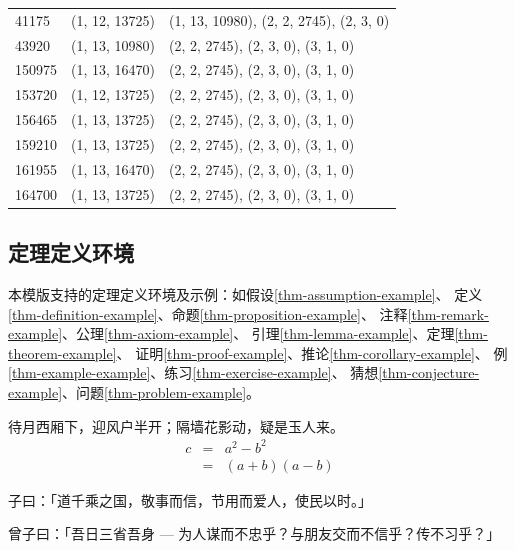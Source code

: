 \begin{longtable}{|l|l|l|}
    41175  & (1, 12, 13725) & (1, 13, 10980), (2,  2, 2745), (2, 3, 0) \\
    43920  & (1, 13, 10980) & (2,  2,  2745), (2,  3,    0), (3, 1, 0) \\
    150975 & (1, 13, 16470) & (2,  2,  2745), (2,  3,    0), (3, 1, 0) \\
    153720 & (1, 12, 13725) & (2,  2,  2745), (2,  3,    0), (3, 1, 0) \\
    156465 & (1, 13, 13725) & (2,  2,  2745), (2,  3,    0), (3, 1, 0) \\
    159210 & (1, 13, 13725) & (2,  2,  2745), (2,  3,    0), (3, 1, 0) \\
    161955 & (1, 13, 16470) & (2,  2,  2745), (2,  3,    0), (3, 1, 0) \\
    164700 & (1, 13, 13725) & (2,  2,  2745), (2,  3,    0), (3, 1, 0) \\
\end{longtable}


\subsection{定理定义环境}
\label{subsec-thm}
本模版支持的定理定义环境及示例：如假设\ref{thm-assumption-example}、
定义\ref{thm-definition-example}、命题\ref{thm-proposition-example}、
注释\ref{thm-remark-example}、公理\ref{thm-axiom-example}、
引理\ref{thm-lemma-example}、定理\ref{thm-theorem-example}、
证明\ref{thm-proof-example}、推论\ref{thm-corollary-example}、
例\ref{thm-example-example}、练习\ref{thm-exercise-example}、
猜想\ref{thm-conjecture-example}、问题\ref{thm-problem-example}。

\begin{assumption}
    \label{thm-assumption-example}
    待月西厢下，迎风户半开；隔墙花影动，疑是玉人来。
    \begin{eqnarray}
        \label{equ-example-assumption}
        c & = & a^2 - b^2\\
          & = & (a+b)(a-b)
    \end{eqnarray}
\end{assumption}

\begin{definition}
    \label{thm-definition-example}
    子曰：「道千乘之国，敬事而信，节用而爱人，使民以时。」
\end{definition}

\begin{proposition}
    \label{thm-proposition-example}
    曾子曰：「吾日三省吾身 --- 为人谋而不忠乎？与朋友交而不信乎？传不习乎？」
\end{proposition}

